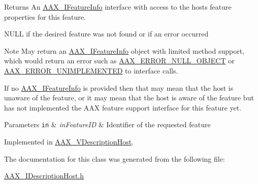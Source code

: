 \begin{DoxyReturn}{Returns}
An \hyperlink{a00100}{A\+A\+X\+\_\+\+I\+Feature\+Info} interface with access to the host\textquotesingle{}s feature properties for this feature. 

{\ttfamily N\+U\+L\+L} if the desired feature was not found or if an error occurred
\end{DoxyReturn}
\begin{DoxyNote}{Note}
May return an \hyperlink{a00100}{A\+A\+X\+\_\+\+I\+Feature\+Info} object with limited method support, which would return an error such as \hyperlink{a00207_a5f8c7439f3a706c4f8315a9609811937a647cce13fa531e3a46c6eab694048a9c}{A\+A\+X\+\_\+\+E\+R\+R\+O\+R\+\_\+\+N\+U\+L\+L\+\_\+\+O\+B\+J\+E\+C\+T} or \hyperlink{a00207_a5f8c7439f3a706c4f8315a9609811937a3b76994b32b97fcd56b19ef8032245df}{A\+A\+X\+\_\+\+E\+R\+R\+O\+R\+\_\+\+U\+N\+I\+M\+P\+L\+E\+M\+E\+N\+T\+E\+D} to interface calls.

If no \hyperlink{a00100}{A\+A\+X\+\_\+\+I\+Feature\+Info} is provided then that may mean that the host is unaware of the feature, or it may mean that the host is aware of the feature but has not implemented the A\+A\+X feature support interface for this feature yet.
\end{DoxyNote}

\begin{DoxyParams}[1]{Parameters}
\mbox{\tt in}  & {\em in\+Feature\+I\+D} & Identifier of the requested feature \\
\hline
\end{DoxyParams}


Implemented in \hyperlink{a00133_a794b4e57c1260ff9b438733a7cf9882b}{A\+A\+X\+\_\+\+V\+Description\+Host}.



The documentation for this class was generated from the following file\+:\begin{DoxyCompactItemize}
\item 
\hyperlink{a00240}{A\+A\+X\+\_\+\+I\+Description\+Host.\+h}\end{DoxyCompactItemize}
